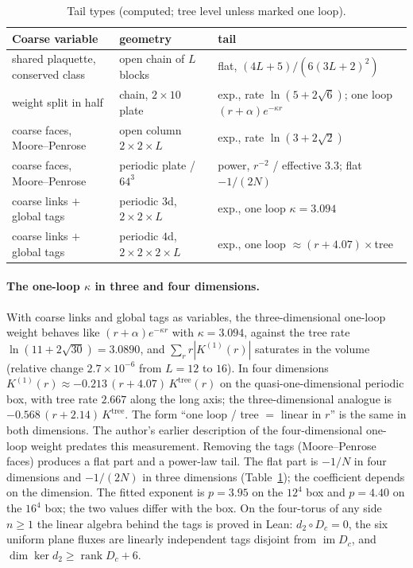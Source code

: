 \documentclass[11pt,a4paper]{article}
\theoremstyle{definition}
\theoremstyle{remark}
\newcommand{\im}{\operatorname{im}}
\begin{document}
\begin{table}[h]\centering\small
\caption{Tail types (computed; tree level unless marked one loop).}\label{tab:tails}
\begin{tabular}{@{}p{}p{}p{}@{}}
\toprule
Coarse variable & geometry & tail\\ \midrule
shared plaquette, conserved class & open chain of $L$ blocks & flat, $(4L+5)/(6(3L+2)^2)$\\
weight split in half & chain, $2\times10$ plate & exp., rate $\ln(5+2\sqrt6)$; one loop $(r+\alpha)e^{-\kappa r}$\\
coarse faces, Moore--Penrose & open column $2\times2\times L$ & exp., rate $\ln(3+2\sqrt2)$\\
coarse faces, Moore--Penrose & periodic plate / $64^3$ & power, $r^{-2}$ / effective $3.3$; flat $-1/(2N)$\\
coarse links $+$ global tags & periodic $3$d, $2\times2\times L$ & exp., one loop $\kappa=3.094$\\
coarse links $+$ global tags & periodic $4$d, $2\times2\times2\times L$ & exp., one loop $\approx(r+4.07)\times$tree\\
\bottomrule
\end{tabular}
\end{table}

\paragraph{The one-loop $\kappa$ in three and four dimensions.}
With coarse links and global tags as variables, the three-dimensional one-loop weight behaves like $(r+\alpha)e^{-\kappa r}$ with $\kappa=3.094$, against the tree rate $\ln(11+2\sqrt{30})=3.0890$, and $\sum_rr|K^{(1)}(r)|$ saturates in the volume (relative change $2.7\times10^{-6}$ from $L=12$ to $16$). In four dimensions $K^{(1)}(r)\approx-0.213\,(r+4.07)\,K^{\mathrm{tree}}(r)$ on the quasi-one-dimensional periodic box, with tree rate $2.667$ along the long axis; the three-dimensional analogue is $-0.568\,(r+2.14)\,K^{\mathrm{tree}}$. The form ``one loop / tree $=$ linear in $r$'' is the same in both dimensions. The author's earlier description of the four-dimensional one-loop weight predates this measurement. Removing the tags (Moore--Penrose faces) produces a flat part and a power-law tail. The flat part is $-1/N$ in four dimensions and $-1/(2N)$ in three dimensions (Table~\ref{tab:tails}); the coefficient depends on the dimension. The fitted exponent is $p=3.95$ on the $12^4$ box and $p=4.40$ on the $16^4$ box; the two values differ with the box.
On the four-torus of any side $n\ge1$ the linear algebra behind the tags is proved in Lean: $d_2\circ D_c=0$, the six uniform plane fluxes are linearly independent tags disjoint from $\im D_c$, and $\dim\ker d_2\ge\operatorname{rank}D_c+6$.
\end{document}
